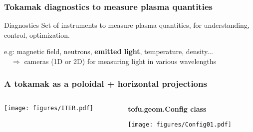 \documentclass[10pt]{beamer}
\begin{document}
\begin{frame}
\frametitle{Tokamak diagnostics to measure plasma quantities}
    
\begin{alertblock}{Diagnostics}
Set of instruments to measure plasma quantities, for understanding, control, optimization.
\end{alertblock}

e.g: magnetic field, neutrons, \textbf{emitted light}, temperature, density...\\[1cm]


$\quad \Rightarrow$ cameras (1D or 2D) for measuring light in various wavelengths
 

%
%
%
%
%



\end{frame}


\begin{frame}
\frametitle{A tokamak as a poloidal + horizontal projections}
    
\begin{columns}
    	
    \begin{column}{0.25\textwidth}
		\texttt{[image: figures/ITER.pdf]}
    \end{column}
    	
	\begin{column}{0.75\textwidth}
		\begin{center}
			\textbf{tofu.geom.Config class}
		\end{center}
		\texttt{[image: figures/Config01.pdf]}
    \end{column}    	
    	
\end{columns}


\end{frame}
\end{document}
